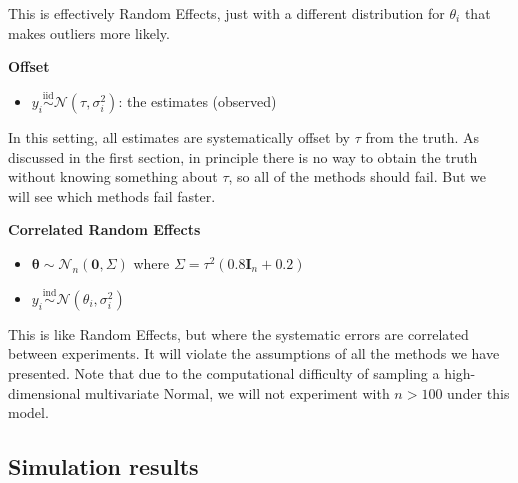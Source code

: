 \documentclass[12pt]{article}
\begin{document}
This is effectively Random Effects, just with a different distribution for $\theta_i$ that makes outliers more likely.

\textbf{Offset}

\begin{itemize}

\item
  $y_i\overset{\mathrm{iid}}{\sim}\mathcal{N}(\tau,\sigma_i^2)$: the estimates (observed)
\end{itemize}

In this setting, all estimates are systematically offset by $\tau$ from the truth. As discussed in the first section, in principle there is no way to obtain the truth without knowing something about $\tau$, so all of the methods should fail. But we will see which methods fail faster.

\textbf{Correlated Random Effects}

\begin{itemize}
\item
  $\boldsymbol{\theta}\sim \mathcal{N}_n(\mathbf{0},\Sigma)$ where $\Sigma=\tau^2(0.8\mathbf{I}_n+0.2)$
\item
  $y_i\overset{\mathrm{ind}}{\sim}\mathcal{N}(\theta_i,\sigma_i^2)$
\end{itemize}

This is like Random Effects, but where the systematic errors are correlated between experiments. It will violate the assumptions of all the methods we have presented. Note that due to the computational difficulty of sampling a high-dimensional multivariate Normal, we will not experiment with $n>100$ under this model.

\subsection{Simulation results}\label{simulation-results}
\end{document}
